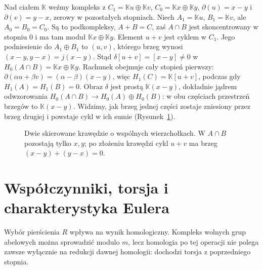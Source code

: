 \begin{przyklad}
\label{prz:mv-niezerowa-delta}
Nad ciałem $\mathbb K$ weźmy kompleks
z $C_1=\mathbb K u\oplus\mathbb K v$,
$C_0=\mathbb K x\oplus\mathbb K y$,
$\partial(u)=x-y$ i $\partial(v)=y-x$,
zerowy w pozostałych stopniach.
Niech $A_1=\mathbb K u$, $B_1=\mathbb K v$,
ale $A_0=B_0=C_0$. Są to podkompleksy,
$A+B=C$, zaś $A\cap B$ jest
skoncentrowany w stopniu $0$
i ma tam moduł $\mathbb K x\oplus\mathbb K y$.
Element $u+v$ jest cyklem w $C_1$.
Jego podniesienie do $A_1\oplus B_1$ to $(u,v)$,
którego brzeg wynosi
$(x-y,y-x)=j(x-y)$. Stąd
$\delta[u+v]=[x-y]\ne0$ w
$H_0(A\cap B)=\mathbb K x\oplus\mathbb K y$.
Rachunek obejmuje cały stopień pierwszy:
$\partial(\alpha u+\beta v)=(\alpha-\beta)(x-y)$,
więc $H_1(C)=\mathbb K[u+v]$,
podczas gdy $H_1(A)=H_1(B)=0$.
Obraz $\delta$ jest prostą $\mathbb K(x-y)$,
dokładnie jądrem odwzorowania
$H_0(A\cap B)\to H_0(A)\oplus H_0(B)$:
w obu częściach przestrzeń brzegów to $\mathbb K(x-y)$.
Widzimy, jak brzeg
jednej części zostaje zniesiony
przez brzeg drugiej i powstaje
cykl w ich sumie (Rysunek~\ref{fig:mv-dwa-luki}).
\end{przyklad}

\begin{figure}[htbp]
\centering
{}
\caption{Dwie skierowane krawędzie o wspólnych wierzchołkach.
 W $A\cap B$ pozostają tylko $x,y$; po złożeniu krawędzi
 cykl $u+v$ ma brzeg $(x-y)+(y-x)=0$.}
\label{fig:mv-dwa-luki}
\end{figure}

\section{Współczynniki, torsja i charakterystyka Eulera}
\label{sec:wspolczynniki-euler}

Wybór pierścienia $R$ wpływa na
wynik homologiczny. Kompleks
wolnych grup abelowych
można sprowadzić modulo $m$,
lecz homologia po tej operacji
nie polega zawsze wyłącznie
na redukcji dawnej homologii:
dochodzi torsja z poprzedniego stopnia.

